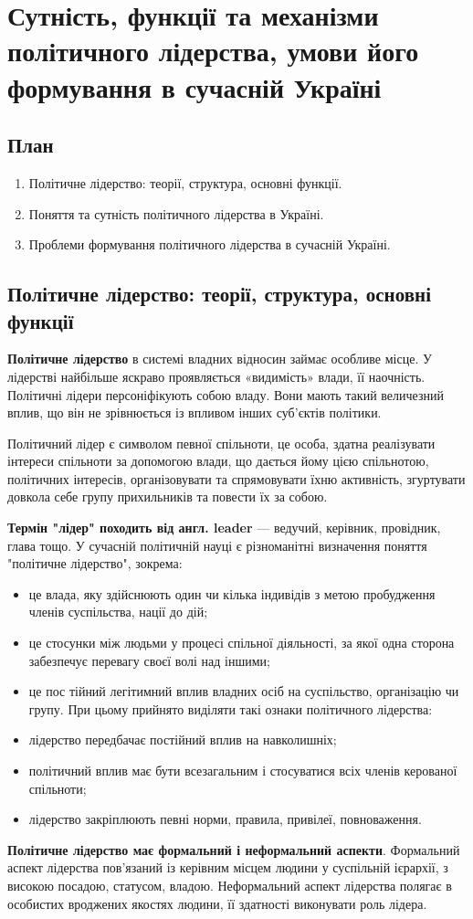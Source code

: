 \section{Сутність, функції та механізми політичного лідерства, умови його формування в сучасній  Україні} 
\subsection{План}
\begin{enumerate}
\item Політичне лідерство: теорії, структура, основні функції.
\item Поняття та сутність політичного лідерства в Україні.
\item Проблеми формування  політичного лідерства в сучасній Україні.
\end{enumerate}
\subsection{Політичне лідерство: теорії, структура, основні функції}
\textbf{Політичне лідерство} в системі владних відносин займає особливе місце. У лідерстві найбільше яскраво проявляється «видимість» влади, її наочність. Політичні лідери персоніфікують собою владу. Вони мають такий величезний вплив, що він не зрівнюється із впливом інших суб'єктів політики.

Політичний лідер є символом певної спільноти, це особа, здатна реалізувати інтереси спільноти за допомогою влади, що дається йому цією спільнотою, політичних інтересів, організовувати та спрямовувати їхню активність, згуртувати довкола себе групу прихильників та повести їх за собою.

\textbf{Термін "лідер" походить від англ. leader} — ведучий, керівник, провідник, глава тощо. У сучасній політичній науці є різноманітні визначення поняття "політичне лідерство", зокрема:
\begin{itemize}
\item це влада, яку здійснюють один чи кілька індивідів з метою пробудження членів суспільства, нації до дій;
\item це стосунки між людьми у процесі спільної діяльності, за якої одна сторона забезпечує перевагу своєї волі над іншими;
\item це пос	тійний легітимний вплив владних осіб на суспільство, організацію чи групу.
При цьому прийнято виділяти такі ознаки політичного лідерства:
\item лідерство передбачає постійний вплив на навколишніх;
\item політичний вплив має бути всезагальним і стосуватися всіх членів керованої спільноти;
\item лідерство закріплюють певні норми, правила, привілеї, повноваження.
\end{itemize}
\textbf{Політичне лідерство має формальний і неформальний аспекти}. Формальний аспект лідерства пов'язаний із керівним місцем людини у суспільній ієрархії, з високою посадою, статусом, владою. Неформальний аспект лідерства полягає в особистих вроджених якостях людини, її здатності виконувати роль лідера.

